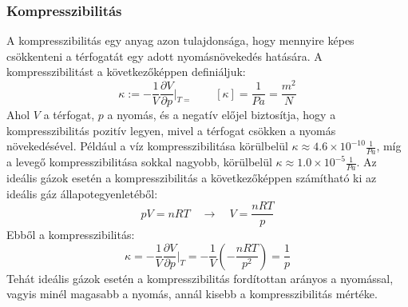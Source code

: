 \documentclass[a4paper,12pt]{article}
\begin{document}
\subsubsection*{Kompresszibilitás}
A kompresszibilitás egy anyag azon tulajdonsága, hogy mennyire képes csökkenteni a térfogatát egy adott nyomásnövekedés hatására. A kompresszibilitást a következőképpen definiáljuk:
\begin{equation}
    \kappa := -\frac{1}{V} \frac{\partial V}{\partial p}\bigg|_{T=} \quad \quad \left[\kappa\right] = \frac{1}{Pa} = \frac{m^2}{N}
\end{equation}
Ahol $V$ a térfogat, $p$ a nyomás, és a negatív előjel biztosítja, hogy a kompresszibilitás pozitív legyen, mivel a térfogat csökken a nyomás növekedésével. Például a víz kompresszibilitása körülbelül $\kappa \approx 4.6 \times 10^{-10} \frac{1}{Pa}$, míg a levegő kompresszibilitása sokkal nagyobb, körülbelül $\kappa \approx 1.0 \times 10^{-5} \frac{1}{Pa}$.
Az ideális gázok esetén a kompresszibilitás a következőképpen számítható ki az ideális gáz állapotegyenletéből:
\begin{equation}
    pV = nRT \quad \rightarrow \quad V = \frac{nRT}{p}
\end{equation}
Ebből a kompresszibilitás:
\begin{equation}
    \kappa = -\frac{1}{V} \frac{\partial V}{\partial p}\bigg|_{T} = -\frac{1}{V} \left(-\frac{nRT}{p^2}\right) = \frac{1}{p}
\end{equation}
Tehát ideális gázok esetén a kompresszibilitás fordítottan arányos a nyomással, vagyis minél magasabb a nyomás, annál kisebb a kompresszibilitás mértéke.
\end{document}
